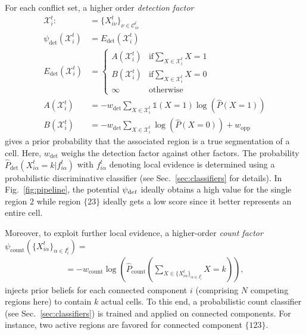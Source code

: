 \documentclass[10pt,twocolumn,letterpaper]{article}
\begin{document}
For each conflict set, a higher order \emph{detection factor}
\begin{align}
    \label{eq:psi-det}
    \mathcal{X}_i^t :&= \{X_{i\nu}^t\}_{\nu\in\mathcal{C}_{i\nu}^t} \\
    \psi_{\text{det}}(\mathcal{X}_i^t) & =
    E_{\text{det}}(\mathcal{X}_i^t) \\ \nonumber
    E_{\text{det}}(\mathcal{X}_i^t) & = 
    \begin{cases}
        A(\mathcal{X}_i^t) &\text{if} \sum_{X \in \mathcal{X}_i^t} X = 1 \\
        B(\mathcal{X}_i^t) &\text{if} \sum_{X \in \mathcal{X}_i^t} X = 0 \\
        \infty &\text{otherwise}
    \end{cases}
    \\ \nonumber
    A(\mathcal{X}_i^t) &=-w_{\text{det}} \sum_{X \in \mathcal{X}_i^t} \mathds{1} (X =
    1)\log(\hat{P}(X=1)) \\ \nonumber
    B(\mathcal{X}_i^t) &= -w_{\text{det}} \sum_{X \in \mathcal{X}_i^t} \log(\hat{P}(X = 0)) + w_{\text{opp}}
\end{align}
gives a prior probability that the associated region is a true segmentation of a cell.
Here, $w_{\text{det}}$ weighs the detection
factor against other factors. The probability $\hat{P}_\mathrm{det}\left(X_{i\alpha}^t = k|f_{i\alpha}^t\right)$
with $f_{i\alpha}^t$ denoting local evidence is determined using a probabilistic discriminative
classifier (see Sec.~\ref{sec:classifiers} for details). In Fig.~\ref{fig:pipeline}, 
the potential $\psi_{\text det}$ ideally obtains a high value for the single region $2$ 
while region $\{23\}$ ideally gets a low score since it better represents an entire cell.

Moreover, to exploit further local evidence, a higher-order \emph{count factor}
$\psi_{\text{count}}(\{X_{i\alpha}^t\}_{\alpha \in I_i^t})=$
\begin{gather}
    \label{eq:psi-count}
      = -w_{\text{count}}\log\left(\hat{P}_{\text{count}}\left(\sum_{X \in \{X_{i\alpha}^t\}_{\alpha \in I_i^t}}X=k\right)\right),    
\end{gather}
injects prior beliefs for each connected component $i$ (comprising $N$ competing regions here) 
to contain $k$ actual cells. 
To this end, a probabilistic count classifier (see Sec.~\ref{sec:classifiers}) is trained and applied on 
connected components.
For instance, 
two active regions are favored for connected component $\{123\}$.
\end{document}
